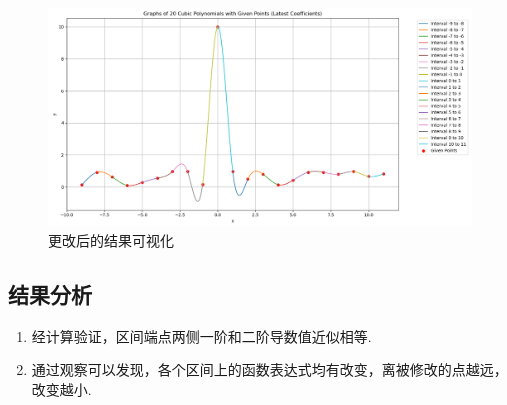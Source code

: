\documentclass[UTF8]{ctexart}
\begin{document}
\begin{figure}[H]
  \centering
  \includegraphics[scale=0.3]{Figure_2.png}
  \caption{更改后的结果可视化}
\end{figure}
\subsection{结果分析}
\begin{enumerate}
  \item 经计算验证，区间端点两侧一阶和二阶导数值近似相等.
  \item 通过观察可以发现，各个区间上的函数表达式均有改变，离被修改的点越远，改变越小.
\end{enumerate}



\end{document}

